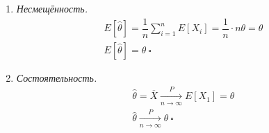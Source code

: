 \begin{enumerate}
    \item \textit{Несмещённость.}
    \[
        \begin{gathered}
            E[\hat{\theta}] = \dfrac{1}{n}\sum_{i=1}^nE[X_i]=\dfrac{1}{n}\cdot n\theta = \theta\\ E[\hat{\theta}]=\theta\ \square
        \end{gathered}
    \]
    \item \textit{Состоятельность.}
    \[
    \begin{gathered}
        \hat{\theta} = \overline{X} \xrightarrow[n \to \infty]{P} E[X_1] = \theta\\
        \hat{\theta}\xrightarrow[n\to\infty]{P}\theta\ \square
    \end{gathered}
    \]
\end{enumerate}